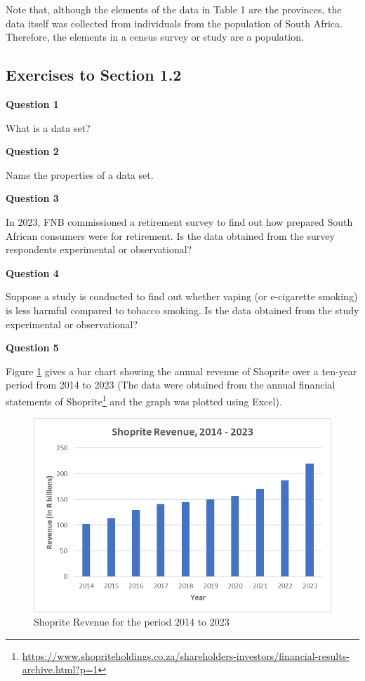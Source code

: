 \documentclass[
]{book}
\begin{document}
Note that, although the elements of the data in Table 1 are the provinces, the data itself was collected from individuals from the population of South Africa. Therefore, the elements in a census survey or study are a population.

\subsection{Exercises to Section 1.2}\label{exercises-to-section-1.2}

\textbf{Question 1}

What is a data set?

\textbf{Question 2}

Name the properties of a data set.

\textbf{Question 3}

In 2023, FNB commissioned a retirement survey to find out how prepared South African consumers were for retirement. Is the data obtained from the survey respondents experimental or observational?

\textbf{Question 4}

Suppose a study is conducted to find out whether vaping (or e-cigarette smoking) is less harmful compared to tobacco smoking. Is the data obtained from the study experimental or observational?

\textbf{Question 5}

Figure \ref{fig:figshp} gives a bar chart showing the annual revenue of Shoprite over a ten-year period from 2014 to 2023 (The data were obtained from the annual financial statements of Shoprite\footnote{\url{https://www.shopriteholdings.co.za/shareholders-investors/financial-results-archive.html?p=1}} and the graph was plotted using Excel).

\begin{figure}
\includegraphics[width=10.78in]{images/clipboard-3088691256} \caption{Shoprite Revenue for the period 2014 to 2023}\label{fig:figshp}
\end{figure}
\end{document}
